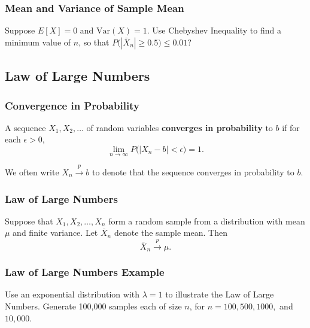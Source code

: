 \documentclass{beamer}
\begin{document}
\begin{frame}[t]
\frametitle{Mean and Variance of Sample Mean}
\begin{Example}
Suppose $E[X] = 0$ and $\text{Var}(X) = 1$. Use Chebyshev Inequality to find a minimum value of $n$, so that $P\Big(|\bar{X}_n| \geq 0.5\Big) \leq 0.01$?
\end{Example}

\end{frame}


\subsection{Law of Large Numbers}

\begin{frame}
\frametitle{Convergence in Probability}
\begin{Definition}
A sequence $X_1, X_2,\ldots$ of random variables {\bf converges in probability} to $b$ if for each $\epsilon > 0$,
$$
\lim_{n\to\infty} P\Big(|X_n - b| < \epsilon\Big) = 1.
$$
\end{Definition}
We often write $X_n\stackrel{p}{\longrightarrow} b$ to denote that the sequence converges in probability to $b$.
\end{frame}

\begin{frame}
\frametitle{Law of Large Numbers}

\begin{Theorem}
Suppose that $X_1, X_2,\ldots, X_n$ form a random sample from a distribution with mean $\mu$ and finite variance. Let $\bar{X}_n$ denote the sample mean. Then
$$
\bar{X}_n\stackrel{p}{\longrightarrow} \mu.
$$
\end{Theorem}

\end{frame}

\begin{frame}[t]
\frametitle{Law of Large Numbers Example}
\begin{Example}
\small
Use an exponential distribution with $\lambda = 1$ to illustrate the Law of Large Numbers. Generate 100,000 samples each of size $n$, for $n = 100, 500, 1000,$ and $10,000$.
\end{Example}

\end{frame}
\end{document}
